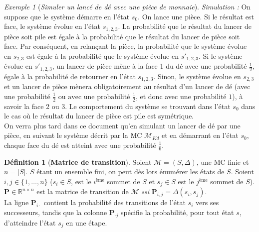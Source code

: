 \documentclass[12pt,a4paper]{report}
\theoremstyle{definition}
\newtheorem{definition}{Définition}[chapter]
\theoremstyle{remark}
\newtheorem{example}{Exemple}[chapter]
\newcommand{\ssi}{\textit{ssi} }
\begin{document}
\begin{example} [\textit{Simuler un lancé de dé avec une pièce de monnaie}]
	\textit{Simulation : }On suppose que le système démarre en l'état $s_0$. On lance une pièce. Si le résultat est face, le système évolue en l'état $s_{1, 2, 3}$. La probabilité que le résultat du lancer de pièce soit pile est égale à la probabilité que le résultat du lancer de pièce soit face. Par conséquent, en relançant la pièce, la probabilité que le système évolue en $s_{2, 3}$ est égale à la probabilité que le système évolue en $s'_{1, 2, 3}$. Si le système évolue en $s'_{1, 2, 3}$, un lancer de pièce mène à la face 1 du dé avec une probabilité $\frac{1}{2}$, égale à la probabilité de retourner en l'état $s_{1, 2, 3}$. Sinon, le système évolue en $s_{2, 3}$ et un lancer de pièce mènera obligatoirement au résultat d'un lancer de dé (avec une probabilité $\frac{1}{2} \text{ ou avec une probabilité }  \frac{1}{2}$, et donc avec une probabilité $1$), à savoir la face 2 ou 3. Le comportement du système se trouvant dans l'état $s_0$ dans le cas où le résultat du lancer de pièce est pile est symétrique.\\
	
	On verra plus tard dans ce document qu'en simulant un lancer de dé par une pièce, en suivant le système décrit par la MC $\mathcal{M}_{Kd}$ et en démarrant en l'état $s_0$, chaque face du dé est atteint avec une probabilité $\frac{1}{6}$.
\end{example}

\begin{definition}[\textbf{Matrice de transition}]
	Soient $\mathcal{M} = (S, \Delta)$, une MC finie et $n = |S|$. $S$ étant un ensemble fini, on peut dès lors énumérer les états de $S$. Soient $i,j \in \{1, \dots, n\}$ ($s_i \in S$, est le $i^{\text{ème}}$ sommet de $S$ et $s_j \in S$ est le $j^{\text{ème}}$ sommet de $S$).
	\textbf{P}$\in \mathbb{R}^{n \times n}$ est la matrice de transition de $\mathcal{M}$ \ssi $\textbf{P}_{i,j} = \Delta(s_i, s_j)$.\\
	La ligne $\textbf{P}_{i \cdot}$ contient la probabilité des transitions de l'état $s_i$ vers ses successeurs, tandis que la colonne $\textbf{P}_{\cdot j}$ spécifie la probabilité, pour tout état $s$, d'atteindre l'état $s_j$ en une étape.
\end{definition}
\end{document}
